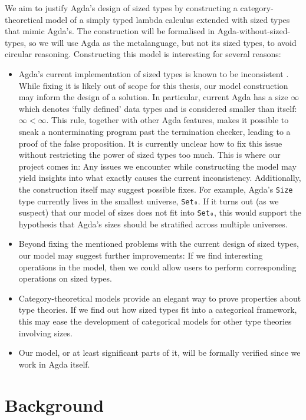 \documentclass{scrartcl}
\begin{document}
We aim to justify Agda's design of sized types by constructing a
category-theoretical model of a simply typed lambda calculus extended with sized
types that mimic Agda's. The construction will be formalised in
Agda-without-sized-types, so we will use Agda as the metalanguage, but not its
sized types, to avoid circular reasoning. Constructing this model is interesting
for several reasons:
\begin{itemize}
\item Agda's current implementation of sized types is known to be inconsistent
  \cite{agdabug-sized2015, agdabug-sized2017}. While fixing it is likely out of
  scope for this thesis, our model construction may inform the design of a
  solution. In particular, current Agda has a size $∞$ which denotes
  \enquote*{fully defined} data types and is considered smaller than itself: $∞
  < ∞$. This rule, together with other Agda features, makes it possible to sneak
  a nonterminating program past the termination checker, leading to a proof of
  the false proposition. It is currently unclear how to fix this issue without
  restricting the power of sized types too much. This is where our project comes
  in: Any issues we encounter while constructing the model may yield insights
  into what exactly causes the current inconsistency. Additionally, the
  construction itself may suggest possible fixes. For example, Agda's
  \texttt{Size} type currently lives in the smallest universe, \texttt{Set₀}. If
  it turns out (as we suspect) that our model of sizes does not fit into
  \texttt{Set₀}, this would support the hypothesis that Agda's sizes should be
  stratified across multiple universes.
\item Beyond fixing the mentioned problems with the current design of sized
  types, our model may suggest further improvements: If we find interesting
  operations in the model, then we could allow users to perform corresponding
  operations on sized types.
\item Category-theoretical models provide an elegant way to prove properties
  about type theories. If we find out how sized types fit into a categorical
  framework, this may ease the development of categorical models for other type
  theories involving sizes.
\item Our model, or at least significant parts of it, will be formally verified
  since we work in Agda itself.
\end{itemize}


\section{Background}
\label{sec:background}
\end{document}
